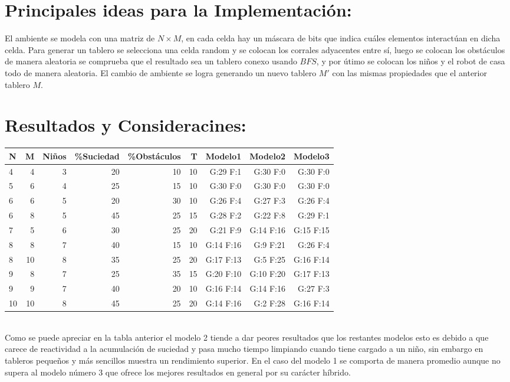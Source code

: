 \documentclass[10pt,letterpaper]{article}
\begin{document}
\section{Principales ideas para la Implementación:}
El ambiente se modela con una matriz de $N \times M$, en cada celda hay un máscara de bits que indica cuáles elementos interactúan en dicha celda. Para generar un tablero se selecciona una celda random y se colocan los corrales adyacentes entre sí, luego se colocan los obstáculos de manera aleatoria se comprueba que el resultado sea un tablero conexo usando $BFS$, y por útimo se colocan los niños y el robot de casa todo de manera aleatoria. El cambio de ambiente se logra generando un nuevo tablero $M'$ con las mismas propiedades que el anterior tablero $M$. 
	

\section{Resultados y Consideracines:}

\begin{tabular}{ |l|r|r|r|r|r|r|r|r| }
	\hline
	N & M & Niños & \%Suciedad & \%Obstáculos & T & Modelo1 & Modelo2 & Modelo3 \\
	\hline
	4 & 4 & 3 & 20 & 10 & 10 & G:29 F:1 & G:30 F:0 & G:30 F:0\\
	\hline
	5 & 6 & 4 & 25 & 15 & 10 & G:30 F:0 & G:30 F:0 & G:30 F:0\\
	\hline
	6 & 6 & 5 & 20 & 30 & 10 & G:26 F:4 & G:27 F:3 & G:26 F:4\\
	\hline
	6 & 8 & 5 & 45 & 25 & 15 & G:28 F:2 & G:22 F:8 & G:29 F:1\\
	\hline
	7 & 5 & 6 & 30 & 25 & 20 & G:21 F:9 & G:14 F:16 & G:15 F:15\\
	\hline
	8 & 8 & 7 & 40 & 15 & 10 & G:14 F:16 & G:9 F:21 & G:26 F:4\\
	\hline
	8 & 10 & 8 & 35 & 25 & 20 & G:17 F:13 & G:5 F:25 & G:16 F:14\\
	\hline
	9 & 8 & 7 & 25 & 35 & 15 & G:20 F:10 & G:10 F:20 & G:17 F:13\\
	\hline
	9 & 9 & 7 & 40 & 20 & 10 & G:16 F:14 & G:14 F:16 & G:27 F:3\\
	\hline
	10 & 10 & 8 & 45 & 25 & 20 & G:14 F:16 & G:2 F:28 & G:16 F:14\\
	\hline
	
\end{tabular}\\

Como se puede apreciar en la tabla anterior el modelo 2 tiende a dar peores resultados que los restantes modelos esto es debido a que carece de reactividad a la acumulación de suciedad y pasa mucho tiempo limpiando cuando tiene cargado a un niño, sin embargo en tableros pequeños y más sencillos muestra un rendimiento superior. En el caso del modelo 1 se comporta de manera promedio aunque no supera al modelo número 3 que ofrece los mejores resultados en general por su carácter híbrido.
 
		
\end{document}
